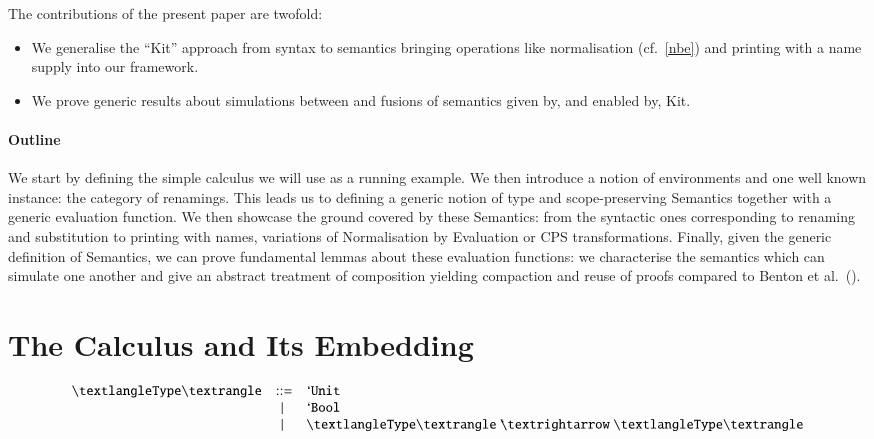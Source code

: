 The contributions of the present paper are twofold:
\begin{itemize}
\item{} We generalise the ``Kit'' approach from syntax to semantics
bringing operations like normalisation (cf.~\cref{nbe}) and printing
with a name supply into our framework.

\item{} We  prove
generic results about simulations between and fusions of semantics
given by, and enabled by, Kit.
\end{itemize}

\paragraph{Outline} We start by defining the simple calculus we will
use as a running example. We then introduce a notion of environments
and one well known instance: the category of renamings. This leads us
to defining a generic notion of type and scope-preserving Semantics
together with a generic evaluation function. We then showcase the
ground covered by these Semantics: from the syntactic ones
corresponding to renaming and substitution to printing with names,
variations of Normalisation by Evaluation or CPS transformations.
Finally, given the generic
definition of Semantics, we can prove fundamental lemmas about these
evaluation functions: we characterise the semantics which can simulate
one another and give an abstract treatment of composition yielding
compaction and reuse of proofs compared to Benton et
al.~(\citeyear{benton2012strongly}).

\section{The Calculus and Its Embedding}


\[
\begin{array}{lcl}
⟨\type{}⟩ & ::=    & \unit{} \\
          & \mid{} & \bool{} \\
          & \mid{} & \arrow{⟨\type{}⟩}{⟨\type{}⟩}
\end{array}
\]
